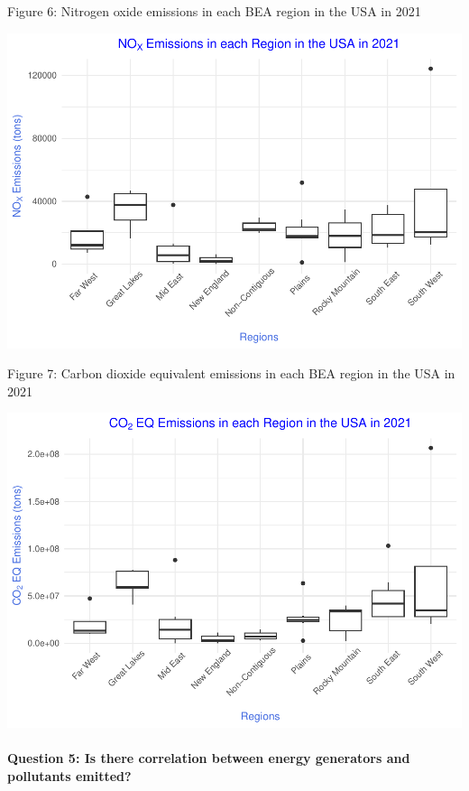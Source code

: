 \documentclass[
]{article}
\begin{document}
Figure 6: Nitrogen oxide emissions in each BEA region in the USA in 2021

\begin{center}\includegraphics{EDA_Project_Mutha_Kry_Ghosh_VS_files/figure-latex/Q4plot_NOX-1} \end{center}

Figure 7: Carbon dioxide equivalent emissions in each BEA region in the
USA in 2021

\begin{center}\includegraphics{EDA_Project_Mutha_Kry_Ghosh_VS_files/figure-latex/Q4plot_CO2e-1} \end{center}

\hypertarget{question-5-is-there-correlation-between-energy-generators-and-pollutants-emitted}{%
\paragraph{Question 5: Is there correlation between energy generators
and pollutants
emitted?}\label{question-5-is-there-correlation-between-energy-generators-and-pollutants-emitted}}
\end{document}
